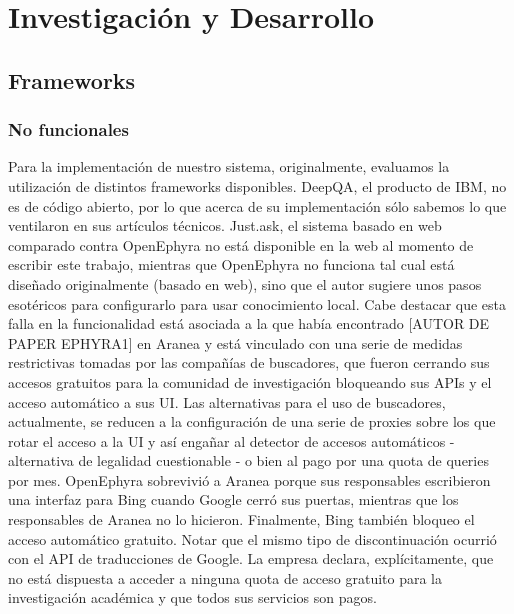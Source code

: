 \chapter{Investigación y Desarrollo}

\section{Frameworks}

\subsection{No funcionales}

Para la implementaci\'on de nuestro sistema, originalmente, evaluamos la
utilizaci\'on de distintos frameworks disponibles. DeepQA, el producto
de IBM, no es de c\'odigo abierto, por lo que acerca de su
implementaci\'on s\'olo sabemos lo que ventilaron en sus art\'iculos
t\'ecnicos. Just.ask, el sistema basado en web comparado contra
OpenEphyra no est\'a disponible en la web al momento de escribir este
trabajo, mientras que OpenEphyra no funciona tal cual est\'a dise\~nado
originalmente (basado en web), sino que el autor sugiere unos pasos
esot\'ericos para configurarlo para usar conocimiento local. Cabe
destacar que esta falla en la funcionalidad est\'a asociada a la que
hab\'ia encontrado [AUTOR DE PAPER EPHYRA1] en Aranea y est\'a
vinculado con una serie de medidas restrictivas tomadas por las
compa\~n\'ias de buscadores, que fueron cerrando sus accesos gratuitos
para la comunidad de investigaci\'on bloqueando sus APIs y el acceso
autom\'atico a sus UI. Las alternativas para el uso de buscadores,
actualmente, se reducen a la configuraci\'on de una serie de proxies
sobre los que rotar el acceso a la UI y as\'i enga\~nar al detector de
accesos autom\'aticos -alternativa de legalidad cuestionable - o bien al 
pago por una quota de queries por mes.
OpenEphyra sobrevivi\'o a Aranea porque sus responsables escribieron
una interfaz para Bing cuando Google cerr\'o sus puertas, mientras que
los responsables de Aranea no lo hicieron. Finalmente, Bing tambi\'en
bloqueo el acceso autom\'atico gratuito. Notar que el mismo tipo de
discontinuaci\'on ocurri\'o con el API de traducciones de Google. La
empresa declara, expl\'icitamente, que no est\'a dispuesta a acceder a
ninguna quota de acceso gratuito para la investigaci\'on acad\'emica y
que todos sus servicios son pagos. 


